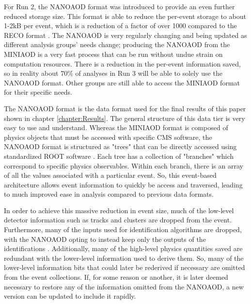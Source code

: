 \documentclass[12pt]{ucsddissertation}
\begin{document}
For Run 2, the NANOAOD format was introduced to provide an even further reduced storage size. This format is able to reduce the per-event storage to about 1-2kB per event, which is a reduction of a factor of over 1000 compared to the RECO format \cite{NanoAOD}. The NANOAOD is very regularly changing and being updated as different analysis groups' needs change; producing the NANOAOD from the MINIAOD is a very fast process that can be run without undue strain on computation resources. There is a reduction in the per-event information saved, so in reality about 70\% of analyses in Run 3 will be able to solely use the NANOAOD format. Other groups are still able to access the MINIAOD format for their specific needs.

The NANOAOD format is the data format used for the final results of this paper shown in chapter \ref{chapter:Results}. The general structure of this data tier is very easy to use and understand. Whereas the MINIAOD format is composed of physics objects that must be accessed with specific CMS software, the NANOAOD format is structured as "trees" that can be directly accessed using standardized ROOT software \cite{NanoAOD}. Each tree has a collection of "branches" which correspond to specific physics observables. Within each branch, there is an array of all the values associated with a particular event. So, this event-based architecture allows event information to quickly be access and traversed, leading to much improved ease in analysis compared to previous data formats.  

In order to achieve this massive reduction in event size, much of the low-level detector information such as tracks and clusters are dropped from the event. Furthermore, many of the inputs used for identification algorithms are dropped, with the NANOAOD opting to instead keep only the outputs of the identifications \cite{NanoAOD}. Additionally, many of the high-level physics quantities saved are redundant with the lower-level information used to derive them. So, many of the lower-level information bits that could later be rederived if necessary are omitted from the event collections. If, for some reason or another, it is later deemed necessary to restore any of the information omitted from the NANOAOD, a new version can be updated to include it rapidly. 
\end{document}
